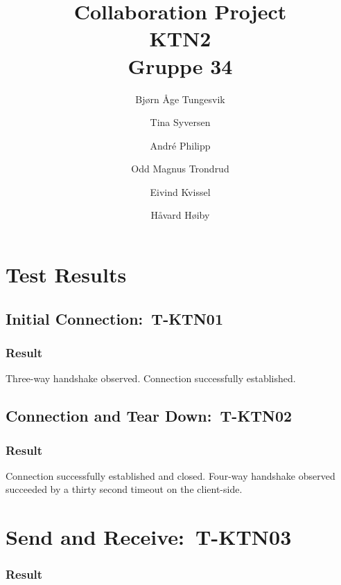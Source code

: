 \documentclass{article}
\begin{document}
\begin{titlepage}
\title{Collaboration Project\\
\textbf{KTN2}\\
Gruppe 34}
\author{Bj\o rn \AA ge Tungesvik\and Tina Syversen\and Andr\'e Philipp\and Odd Magnus Trondrud\and Eivind Kvissel\and H\aa vard H\o iby}
\maketitle
\end{titlepage}
\newpage %

\newpage 

\section{Test Results}

\subsection{Initial Connection:\ T-KTN01}

\subsubsection{Result}

Three-way handshake observed. Connection successfully established.

\subsection{Connection and Tear Down:\ T-KTN02}

\subsubsection{Result}

Connection successfully established and closed. Four-way handshake observed
succeeded by a thirty second timeout on the client-side.

\section{Send and Receive:\ T-KTN03}

\subsubsection{Result}
\end{document}
